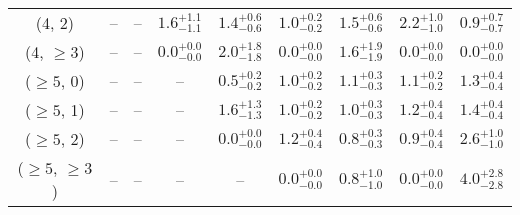 \begin{table}[h!]
{\begin{tabular}{ccccccccc}
	(4, 2) & -- & -- & $1.6^{+ 1.1 }_{- 1.1 }$ & $1.4^{+ 0.6 }_{- 0.6 }$ & $1.0^{+ 0.2 }_{- 0.2 }$ & $1.5^{+ 0.6 }_{- 0.6 }$ & $2.2^{+ 1.0 }_{- 1.0 }$ & $0.9^{+ 0.7 }_{- 0.7 }$ \\[0.5ex] 
	(4, $\ge3$) & -- & -- & $0.0^{+ 0.0 }_{- 0.0 }$ & $2.0^{+ 1.8 }_{- 1.8 }$ & $0.0^{+ 0.0 }_{- 0.0 }$ & $1.6^{+ 1.9 }_{- 1.9 }$ & $0.0^{+ 0.0 }_{- 0.0 }$ & $0.0^{+ 0.0 }_{- 0.0 }$ \\[0.5ex] 
	($\ge5$, 0) & -- & -- & -- & $0.5^{+ 0.2 }_{- 0.2 }$ & $1.0^{+ 0.2 }_{- 0.2 }$ & $1.1^{+ 0.3 }_{- 0.3 }$ & $1.1^{+ 0.2 }_{- 0.2 }$ & $1.3^{+ 0.4 }_{- 0.4 }$ \\[0.5ex] 
	($\ge5$, 1) & -- & -- & -- & $1.6^{+ 1.3 }_{- 1.3 }$ & $1.0^{+ 0.2 }_{- 0.2 }$ & $1.0^{+ 0.3 }_{- 0.3 }$ & $1.2^{+ 0.4 }_{- 0.4 }$ & $1.4^{+ 0.4 }_{- 0.4 }$ \\[0.5ex] 
	($\ge5$, 2) & -- & -- & -- & $0.0^{+ 0.0 }_{- 0.0 }$ & $1.2^{+ 0.4 }_{- 0.4 }$ & $0.8^{+ 0.3 }_{- 0.3 }$ & $0.9^{+ 0.4 }_{- 0.4 }$ & $2.6^{+ 1.0 }_{- 1.0 }$ \\[0.5ex] 
	($\ge5$, $\ge3$) & -- & -- & -- & -- & $0.0^{+ 0.0 }_{- 0.0 }$ & $0.8^{+ 1.0 }_{- 1.0 }$ & $0.0^{+ 0.0 }_{- 0.0 }$ & $4.0^{+ 2.8 }_{- 2.8 }$ \\[0.5ex] 
	\hline
	\hline
\end{tabular}}
\end{table}
